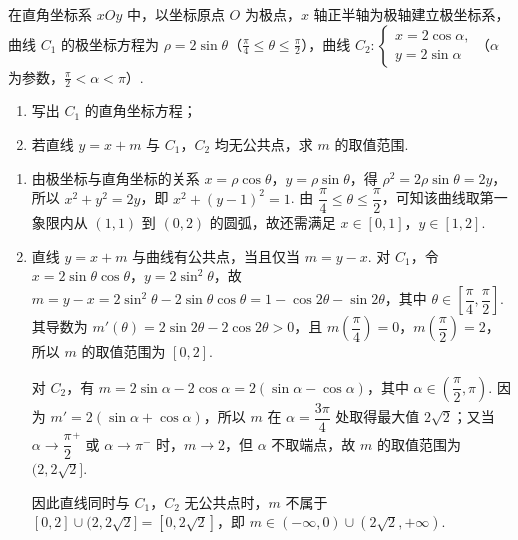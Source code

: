 \begin{problem}
在直角坐标系 \(xOy\) 中，以坐标原点 \(O\) 为极点，\(x\) 轴正半轴为极轴建立极坐标系，曲线 \(C_1\) 的极坐标方程为 \(\rho=2\sin\theta\)（\(\frac\pi4\le\theta\le\frac\pi2\)），曲线 \(C_2:\begin{cases}
x=2\cos\alpha,\\
y=2\sin\alpha
\end{cases}\)（\(\alpha\) 为参数，\(\frac\pi2<\alpha<\pi\)）.
\begin{enumerate}
\item 写出 \(C_1\) 的直角坐标方程；
\item 若直线 \(y=x+m\) 与 \(C_1\)，\(C_2\) 均无公共点，求 \(m\) 的取值范围.
\end{enumerate}

\begin{solution}
\begin{enumerate}
\item 由极坐标与直角坐标的关系 \(x=\rho\cos\theta\)，\(y=\rho\sin\theta\)，得 \(\rho^2=2\rho\sin\theta=2y\)，所以
\(x^2+y^2=2y\)，即 \(x^2+(y-1)^2=1\). 由 \(\dfrac\pi4\le\theta\le\dfrac\pi2\)，可知该曲线取第一象限内从 \((1,1)\) 到 \((0,2)\) 的圆弧，故还需满足 \(x\in[0,1]\)，\(y\in[1,2]\).
\item 直线 \(y=x+m\) 与曲线有公共点，当且仅当 \(m=y-x\). 对 \(C_1\)，令
\(x=2\sin\theta\cos\theta\)，\(y=2\sin^2\theta\)，故 \(m=y-x=2\sin^2\theta-2\sin\theta\cos\theta=1-\cos2\theta-\sin2\theta\)，其中 \(\theta\in\left[\dfrac\pi4,\dfrac\pi2\right]\). 其导数为 \(m'(\theta)=2\sin2\theta-2\cos2\theta>0\)，且 \(m\left(\dfrac\pi4\right)=0\)，\(m\left(\dfrac\pi2\right)=2\)，所以 \(m\) 的取值范围为 \([0,2]\).

对 \(C_2\)，有 \(m=2\sin\alpha-2\cos\alpha=2(\sin\alpha-\cos\alpha)\)，其中 \(\alpha\in\left(\dfrac\pi2,\pi\right)\). 因为 \(m'=2(\sin\alpha+\cos\alpha)\)，所以 \(m\) 在 \(\alpha=\dfrac{3\pi}{4}\) 处取得最大值 \(2\sqrt2\)；又当 \(\alpha\to\dfrac\pi2^+\) 或 \(\alpha\to\pi^-\) 时，\(m\to2\)，但 \(\alpha\) 不取端点，故 \(m\) 的取值范围为 \((2,2\sqrt2]\).

因此直线同时与 \(C_1\)，\(C_2\) 无公共点时，\(m\) 不属于 \([0,2]\cup(2,2\sqrt2]=[0,2\sqrt2]\)，即
\(m\in(-\infty,0)\cup(2\sqrt2,+\infty)\).
\end{enumerate}
\end{solution}
\end{problem}

